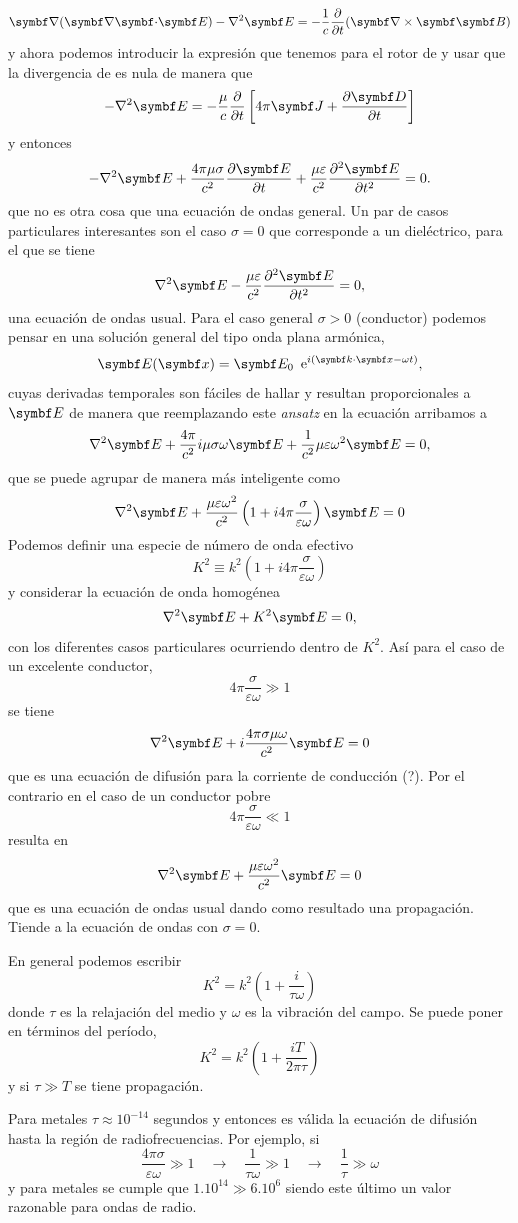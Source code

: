 \documentclass[10pt,oneside]{CBFT_book}
\begin{document}
\[
	\Nabla{(\divem{E})}-\lapm{\vb{E}} = -\frac{1}{c}\dpar{}{t}{(\rotorm{\vb{B}})}
\]
y ahora podemos introducir la expresión que tenemos para el rotor de  y 
usar que la divergencia de  es nula de manera que
\[
	-\lapm{\vb{E}}= -\frac{\mu}{c} \dparbis{ 4\pi\vb{J} + \dpar{\vb{D}}{t} }{t}
\]
y entonces
\[
	-\lapm{\vb{E}} + \frac{4\pi\mu\sigma}{c^2} \dpar{\vb{E}}{t} + 
			\frac{\mu\varepsilon}{c^2}\ddpar{\vb{E}}{t} = 0.
\label{onda_gen}
\]
que no es otra cosa que una ecuación de ondas general.
Un par de casos particulares interesantes son el caso $\sigma=0$ que corresponde a
un dieléctrico, para el que se tiene 
\[
	\lapm{\vb{E}} - \frac{\mu\varepsilon}{c^2}\ddpar{\vb{E}}{t} = 0,
\]
una ecuación de ondas usual. Para el caso general $\sigma > 0$ (conductor) podemos
pensar en una solución general del tipo onda plana armónica,
\[
	\vb{E}(\vb{x})=\vb{E_0}\;\euler^{i(\vb{k}\cdot\vb{x}-\omega t)},
\]
cuyas derivadas temporales son fáciles de hallar y resultan proporcionales a $\vb{E}$
de manera que reemplazando este {\it ansatz} en la ecuación arribamos a
\[
	\lapm{\vb{E}} + \frac{4\pi}{c^2}i\mu\sigma\omega\vb{E} +
		\frac{1}{c^2}\mu\varepsilon\omega^2 \vb{E} = 0,
\]
que se puede agrupar de manera más inteligente como 
\[
	\lapm{\vb{E}} + \frac{\mu\varepsilon\omega^2}{c^2}
		\left( 1 + i 4 \pi \frac{\sigma}{\varepsilon\omega}\right)\vb{E} = 0
\]
Podemos definir una especie de número de onda efectivo
\[
	K^2 \equiv k^2 \left( 1 + i 4 \pi \frac{\sigma}{\varepsilon\omega}\right)
\]
y considerar la ecuación de onda homogénea
\[
	\lapm{\vb{E}} + K^2 \vb{E} = 0,
\]
con los diferentes casos particulares ocurriendo dentro de $K^2$. Así para el caso de
un excelente conductor,
\[
	4 \pi \frac{\sigma}{\varepsilon\omega} \gg 1
\]
se tiene 
\[
	\lapm{\vb{E}} + i \frac{4 \pi \sigma \mu\omega}{c^2} \vb{E} = 0
\]
que es una ecuación de difusión para la corriente de conducción (?). Por el contrario en el
caso de un conductor pobre 
\[
	4 \pi \frac{\sigma}{\varepsilon\omega} \ll 1
\]
resulta en 
\[
	\lapm{\vb{E}} + \frac{\mu\varepsilon\omega^2}{c^2} \vb{E} = 0
\]
que es una ecuación de ondas usual dando como resultado una propagación. Tiende a la ecuación
de ondas con $\sigma=0$.

En general podemos escribir
\[
	K^2 = k^2 \left( 1 + \frac{i}{\tau \omega} \right)
\]
donde $\tau$ es la relajación del medio y $\omega$ es la vibración del campo. Se puede poner en
términos del período,
\[
	K^2 = k^2 \left( 1 + \frac{iT}{ 2 \pi \tau } \right)
\]
y si $\tau \gg T$ se tiene propagación.

Para metales $\tau \approx 10^{-14}$ segundos y entonces es válida la ecuación de difusión
hasta la región de radiofrecuencias. Por ejemplo, si 
\[
	\frac{4\pi\sigma}{\varepsilon\omega} \gg 1 \quad \rightarrow \quad \frac{1}{\tau\omega} \gg 1 
			\quad \rightarrow \quad \frac{1}{\tau} \gg \omega
\]
y para metales se cumple que $1.10^{14} \gg 6.10^6$ siendo este último un valor razonable para ondas de radio.
\end{document}
